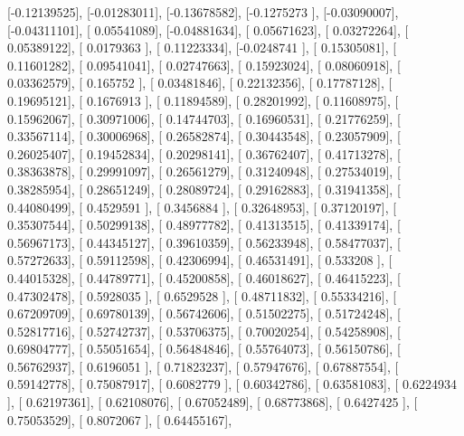\documentclass{article}
\begin{document}
       [-0.12139525],
       [-0.01283011],
       [-0.13678582],
       [-0.1275273 ],
       [-0.03090007],
       [-0.04311101],
       [ 0.05541089],
       [-0.04881634],
       [ 0.05671623],
       [ 0.03272264],
       [ 0.05389122],
       [ 0.0179363 ],
       [ 0.11223334],
       [-0.0248741 ],
       [ 0.15305081],
       [ 0.11601282],
       [ 0.09541041],
       [ 0.02747663],
       [ 0.15923024],
       [ 0.08060918],
       [ 0.03362579],
       [ 0.165752  ],
       [ 0.03481846],
       [ 0.22132356],
       [ 0.17787128],
       [ 0.19695121],
       [ 0.1676913 ],
       [ 0.11894589],
       [ 0.28201992],
       [ 0.11608975],
       [ 0.15962067],
       [ 0.30971006],
       [ 0.14744703],
       [ 0.16960531],
       [ 0.21776259],
       [ 0.33567114],
       [ 0.30006968],
       [ 0.26582874],
       [ 0.30443548],
       [ 0.23057909],
       [ 0.26025407],
       [ 0.19452834],
       [ 0.20298141],
       [ 0.36762407],
       [ 0.41713278],
       [ 0.38363878],
       [ 0.29991097],
       [ 0.26561279],
       [ 0.31240948],
       [ 0.27534019],
       [ 0.38285954],
       [ 0.28651249],
       [ 0.28089724],
       [ 0.29162883],
       [ 0.31941358],
       [ 0.44080499],
       [ 0.4529591 ],
       [ 0.3456884 ],
       [ 0.32648953],
       [ 0.37120197],
       [ 0.35307544],
       [ 0.50299138],
       [ 0.48977782],
       [ 0.41313515],
       [ 0.41339174],
       [ 0.56967173],
       [ 0.44345127],
       [ 0.39610359],
       [ 0.56233948],
       [ 0.58477037],
       [ 0.57272633],
       [ 0.59112598],
       [ 0.42306994],
       [ 0.46531491],
       [ 0.533208  ],
       [ 0.44015328],
       [ 0.44789771],
       [ 0.45200858],
       [ 0.46018627],
       [ 0.46415223],
       [ 0.47302478],
       [ 0.5928035 ],
       [ 0.6529528 ],
       [ 0.48711832],
       [ 0.55334216],
       [ 0.67209709],
       [ 0.69780139],
       [ 0.56742606],
       [ 0.51502275],
       [ 0.51724248],
       [ 0.52817716],
       [ 0.52742737],
       [ 0.53706375],
       [ 0.70020254],
       [ 0.54258908],
       [ 0.69804777],
       [ 0.55051654],
       [ 0.56484846],
       [ 0.55764073],
       [ 0.56150786],
       [ 0.56762937],
       [ 0.6196051 ],
       [ 0.71823237],
       [ 0.57947676],
       [ 0.67887554],
       [ 0.59142778],
       [ 0.75087917],
       [ 0.6082779 ],
       [ 0.60342786],
       [ 0.63581083],
       [ 0.6224934 ],
       [ 0.62197361],
       [ 0.62108076],
       [ 0.67052489],
       [ 0.68773868],
       [ 0.6427425 ],
       [ 0.75053529],
       [ 0.8072067 ],
       [ 0.64455167],
\end{document}
